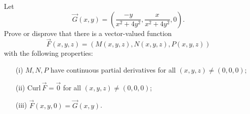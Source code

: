 Let
\[
\vec{G}(x,y) = \left( \frac{-y}{x^2+4y^2}, \frac{x}{x^2+4y^2},0
\right).
\]
Prove or disprove that there is a vector-valued function
\[
\vec{F}(x,y,z) = (M(x,y,z), N(x,y,z), P(x,y,z))
\]
with the following properties:
\begin{enumerate}
\item[(i)] $M,N,P$ have continuous partial derivatives for all
$(x,y,z) \neq (0,0,0)$;
\item[(ii)] $\mathrm{Curl}\,\vec{F} = \vec{0}$ for all $(x,y,z) \neq (0,0,0)$;
\item[(iii)] $\vec{F}(x,y,0) = \vec{G}(x,y)$.
\end{enumerate}
